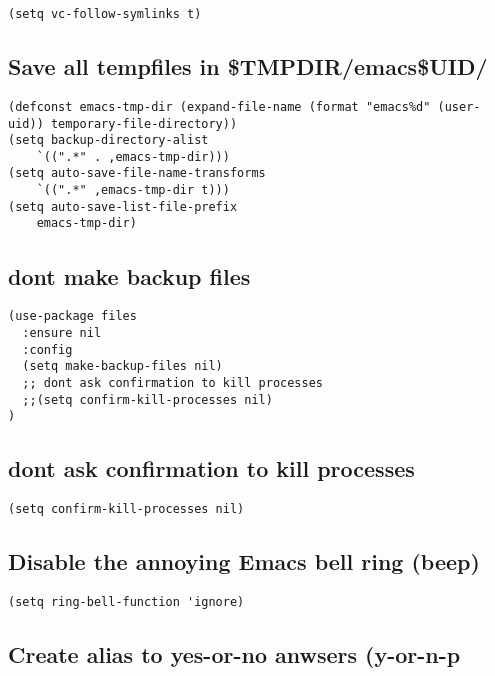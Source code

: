 \documentclass[11pt]{article}
\begin{document}
\begin{verbatim}
(setq vc-follow-symlinks t)
\end{verbatim}

\subsection*{Save all tempfiles in \$TMPDIR/emacs\$UID/}
\label{sec:org074dfaf}

\begin{verbatim}
(defconst emacs-tmp-dir (expand-file-name (format "emacs%d" (user-uid)) temporary-file-directory))
(setq backup-directory-alist
    `((".*" . ,emacs-tmp-dir)))
(setq auto-save-file-name-transforms
    `((".*" ,emacs-tmp-dir t)))
(setq auto-save-list-file-prefix
    emacs-tmp-dir)
\end{verbatim}

\subsection*{dont make backup files}
\label{sec:org892e052}

\begin{verbatim}
(use-package files
  :ensure nil
  :config
  (setq make-backup-files nil)
  ;; dont ask confirmation to kill processes
  ;;(setq confirm-kill-processes nil)
)
\end{verbatim}

\subsection*{dont ask confirmation to kill processes}
\label{sec:org8c5a04a}

\begin{verbatim}
(setq confirm-kill-processes nil)
\end{verbatim}

\subsection*{Disable the annoying Emacs bell ring (beep)}
\label{sec:orgbdb3d09}

\begin{verbatim}
(setq ring-bell-function 'ignore)
\end{verbatim}

\subsection*{Create alias to yes-or-no anwsers (y-or-n-p}
\label{sec:org038ec93}
\end{document}
